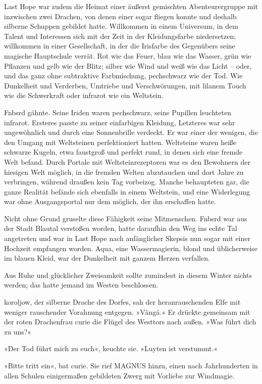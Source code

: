 Last Hope war zudem die Heimat einer äußerst gemischten Abenteurergruppe mit inzwischen zwei Drachen, von denen einer sogar fliegen konnte und deshalb silberne Schuppen gebildet hatte. Willkommen in einem Universum, in dem Talent und Interessen sich mit der Zeit in der Kleidungsfarbe niedersetzen; willkommen in einer Gesellschaft, in der die Irisfarbe des Gegenübers seine magische Hauptschule verrät. Rot wie das Feuer, blau wie das Wasser, grün wie Pflanzen und gelb wie der Blitz; silber wie Wind und weiß wie das Licht – oder, und das ganz ohne subtraktive Farbmischung, pechschwarz wie der Tod. Wie Dunkelheit und Verderben, Umtriebe und Verschwörungen, mit lilanem Touch wie die Schwerkraft oder infrarot wie ein Weltstein.

Fnbsrd gähnte. Seine Iriden waren pechschwarz, seine Pupillen leuchteten infrarot. Ersteres passte zu seiner einfarbigen Kleidung, Letzteres war sehr ungewöhnlich und durch eine Sonnenbrille verdeckt. Er war einer der wenigen, die den Umgang mit Weltsteinen perfektioniert hatten. Weltsteine waren heiße schwarze Kugeln, etwa faustgroß und perfekt rund, in denen sich eine fremde Welt befand. Durch Portale mit Weltsteinrezeptoren war es den Bewohnern der hiesigen Welt möglich, in die fremden Welten abzutauchen und dort Jahre zu verbringen, während draußen kein Tag vorbeizog. Manche behaupteten gar, die ganze Realität befände sich ebenfalls in einem Weltstein, und eine Widerlegung war ohne Ausgangsportal nur dem möglich, der ihn erschaffen hatte.

Nicht ohne Grund gruselte diese Fähigkeit seine Mitmenschen. Fnbsrd war aus der Stadt Blautal verstoßen worden, hatte daraufhin den Weg ins echte Tal angetreten und war in Last Hope nach anfänglicher Skepsis nun sogar mit einer Hochzeit empfangen worden. Aqua, eine Wassermagierin, blond und üblicherweise im blauen Kleid, war der Dunkelheit mit ganzem Herzen verfallen.

Aus Ruhe und glücklicher Zweisamkeit sollte zumindest in diesem Winter nichts werden; das hatte jemand im Westen beschlossen.

koroljow, der silberne Drache des Dorfes, sah der heranrauschenden Elfe mit weniger rauschender Vorahnung entgegen. »Vängä.« Er drückte gemeinsam mit der roten Drachenfrau curie die Flügel des Westtors nach außen. »Was führt dich zu uns?«

»Der Tod führt mich zu euch«, keuchte sie. »Luyten ist verstummt.«

»Bitte tritt ein«, bat curie. Sie rief MAGNUS hinzu, einen nach Jahrhunderten in allen Schulen einigermaßen gebildeten Zwerg mit Vorliebe zur Windmagie.


